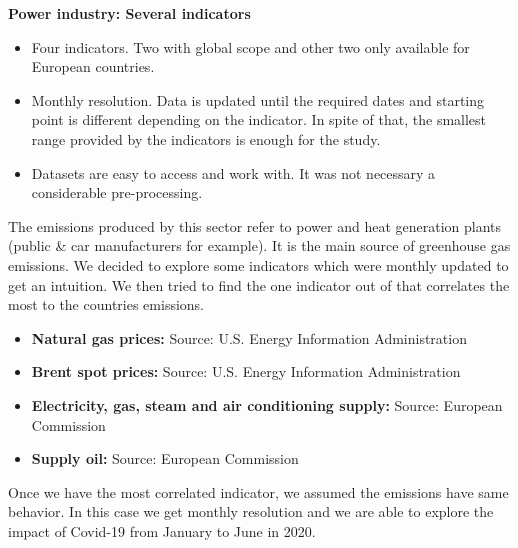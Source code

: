 
\vspace{1em}
\textbf{Power industry: Several indicators}
\begin{itemize}
	\item Four indicators. Two with global scope and other two only available for European countries.
	\item Monthly resolution. Data is updated until the required dates and starting point is different depending on the indicator. In spite of that, the smallest range provided by the indicators is enough for the study.
	\item Datasets are easy to access and work with. It was not necessary a considerable pre-processing. 
\end{itemize}

The emissions produced by this sector refer to power and heat generation plants (public \& car manufacturers for example). It is the main source of greenhouse gas emissions. We decided to explore some indicators which were monthly updated to get an intuition. We then tried to find the one indicator out of that correlates the most to the countries \co emissions.

\newpage

\begin{itemize}
	\item \textbf{Natural gas prices:} Source: U.S. Energy Information Administration
	\item \textbf{Brent spot prices:} Source: U.S. Energy Information Administration
	\item \textbf{Electricity, gas, steam and air conditioning supply:} Source: European Commission
	\item \textbf{Supply oil:} Source: European Commission
\end{itemize}

Once we have the most correlated indicator, we assumed the emissions have same behavior. In this case we get monthly resolution and we are able to explore the impact of Covid-19 from January to June in 2020.

